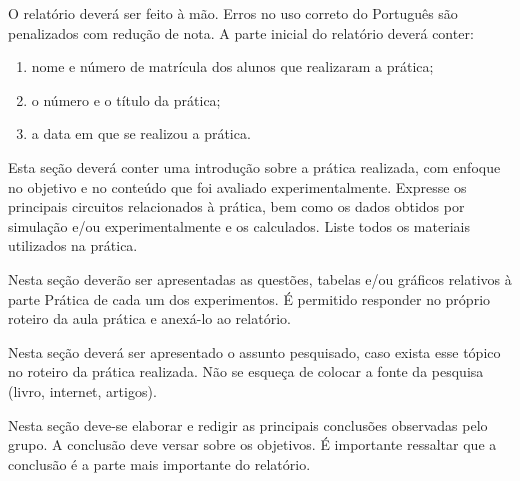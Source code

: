 

O relatório deverá ser feito à mão. Erros no uso correto do Português são penalizados
com redução de nota. A parte inicial do relatório deverá conter:

\begin{enumerate}[label=\alph*),leftmargin=1.2cm]
  \item nome e número de matrícula dos alunos que realizaram a prática;
  \item o número e o título da prática;
  \item a data em que se realizou a prática.
\end{enumerate}


Esta seção deverá conter uma introdução sobre a prática realizada, com enfoque no
objetivo e no conteúdo que foi avaliado experimentalmente. Expresse os principais
circuitos relacionados à prática, bem como os dados obtidos por simulação e/ou
experimentalmente e os calculados. Liste todos os materiais utilizados na prática.


Nesta seção deverão ser apresentadas as questões, tabelas e/ou gráficos relativos à
parte Prática de cada um dos experimentos. É permitido responder no próprio roteiro da
aula prática e anexá-lo ao relatório.


Nesta seção deverá ser apresentado o assunto pesquisado, caso exista esse tópico no
roteiro da prática realizada. Não se esqueça de colocar a fonte da pesquisa (livro,
internet, artigos).


Nesta seção deve-se elaborar e redigir as principais conclusões observadas pelo grupo.
A conclusão deve versar sobre os objetivos. É importante ressaltar que a conclusão é a
parte mais importante do relatório.
